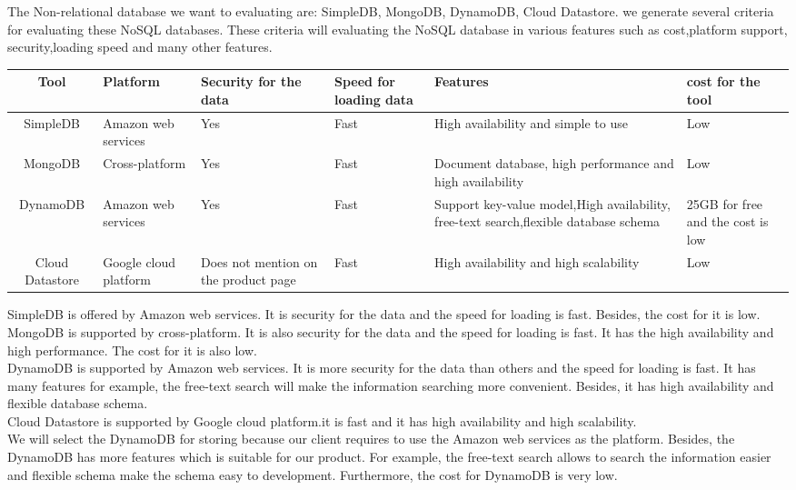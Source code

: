 	    \noindent The Non-relational database we want to evaluating are: SimpleDB, MongoDB, DynamoDB, Cloud Datastore. we generate several criteria for evaluating these NoSQL databases. These criteria will evaluating the NoSQL database in various features such as cost,platform support, security,loading speed and many other features.
        \\
        \begin{longtable}{|c|p{2cm}|p{2cm}|p{1cm}|p{5cm}|p{3cm}|}
            \hline
            \textbf{Tool} & \textbf{Platform} & \textbf{Security for the data} & \textbf{Speed for loading data} & \textbf{Features} & \textbf{cost for the tool}\\
            \hline
            SimpleDB & Amazon web services & Yes & Fast & High availability and simple to use & Low \\
            \hline
            MongoDB & Cross-platform & Yes & Fast & Document database, high performance and high availability & Low \\
            \hline
            DynamoDB & Amazon web services & Yes & Fast & Support key-value model,High availability, free-text search,flexible database schema & 25GB for free and the cost is low\\
            \hline
             Cloud Datastore & Google cloud platform & Does not mention on the product page & Fast & High availability and high scalability & Low\\
            \hline
        \end{longtable}
 
 	    \noindent SimpleDB is offered by Amazon web services. It is security for the data and the speed for loading is fast. Besides, the cost for it is low.\\

        \noindent MongoDB is supported by cross-platform. It is also security for the data and the speed for loading is fast. It has the high availability and high performance. The cost for it is also low.\\

        \noindent DynamoDB is supported by Amazon web services. It is more security for the data than others and the speed for loading is fast. It has many features for example, the free-text search will make the information searching more convenient\cite{W5}. Besides, it has high availability and flexible database schema.\\

        \noindent Cloud Datastore is supported by Google cloud platform.it is fast and it has high availability and high scalability.\\

        \noindent We will select the DynamoDB for storing because our client requires to use the Amazon web services as the platform. Besides, the DynamoDB has more features which is suitable for our product. For example, the free-text search allows to search the information easier and flexible schema make the schema easy to development. Furthermore, the cost for DynamoDB is very low.
